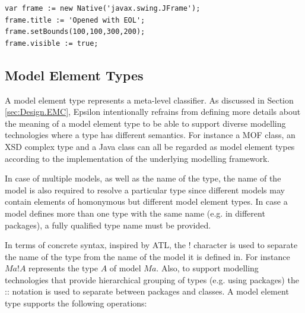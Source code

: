 \begin{lstlisting}[basicstyle=\ttfamily\footnotesize, flexiblecolumns=true, numbers=none, nolol=true, caption=Demonstration of NativeType in EOL, label=lst:Native, numbers=left, language=EOL, tabsize=2]
var frame := new Native('javax.swing.JFrame');
frame.title := 'Opened with EOL';
frame.setBounds(100,100,300,200);
frame.visible := true;
\end{lstlisting}

\subsection{Model Element Types}

A model element type represents a meta-level classifier. As discussed in Section \ref{sec:Design.EMC}, Epsilon intentionally refrains from defining more details about the meaning of a model element type to be able to support diverse modelling technologies where a type has different semantics. For instance a MOF class, an XSD complex type and a Java class can all be regarded as model element types according to the implementation of the underlying modelling framework.

In case of multiple models, as well as the name of the type, the name of the model is also required to resolve a particular type since different models may contain elements of homonymous but different model element types. In case a model defines more than one type with the same name (e.g. in different packages), a fully qualified type name must be provided.

In terms of concrete syntax, inspired by ATL, the ! character is used to separate the name of the type from the name of the model it is defined in. For instance $Ma!A$ represents the type $A$ of model $Ma$. Also, to support modelling technologies that provide hierarchical grouping of types (e.g. using packages) the :: notation is used to separate between packages and classes.  A model element type supports the following operations:

